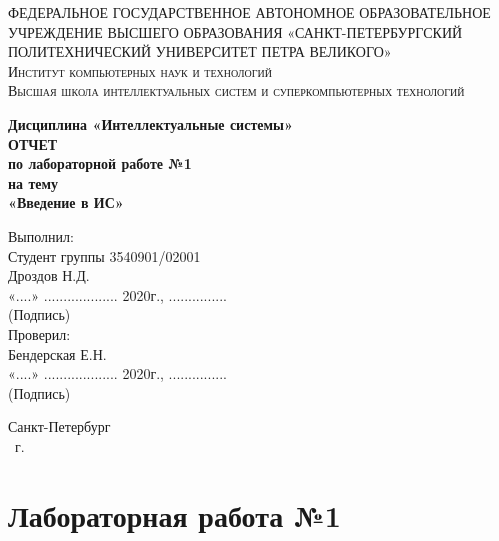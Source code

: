 \documentclass[14pt,a4paper,report]{report}
\begin{document}
\def\contentsname{Содержание}

\begin{titlepage}
	\begin{center}
		\textsc{ФЕДЕРАЛЬНОЕ ГОСУДАРСТВЕННОЕ АВТОНОМНОЕ ОБРАЗОВАТЕЛЬНОЕ УЧРЕЖДЕНИЕ ВЫСШЕГО ОБРАЗОВАНИЯ
«САНКТ-ПЕТЕРБУРГСКИЙ ПОЛИТЕХНИЧЕСКИЙ УНИВЕРСИТЕТ ПЕТРА ВЕЛИКОГО»\\[5mm]
			Институт компьютерных наук и технологий\\
			Высшая школа интеллектуальных систем и суперкомпьютерных технологий}
		
		\vfill
		
		\textbf{Дисциплина «Интеллектуальные системы»\\[10mm]
		ОТЧЕТ\\[2mm]
		по лабораторной работе №1\\[2mm]
		на тему\\[2mm]
			«Введение в ИС»\\[41mm]
		}
	\end{center}
	
	\hfill
	\begin{minipage}{.4\textwidth}
		Выполнил:\\[2mm] 
        Студент группы 3540901/02001\\
		Дроздов Н.Д.\\[2mm]
        «....» ................... 2020г., ...............\\
        \hspace*{38mm} (Подпись)\\[2mm]
		Проверил:\\[2mm] 
		Бендерская Е.Н.\\[2mm]
		«....» ................... 2020г., ...............\\
        \hspace*{38mm} (Подпись)\\
	\end{minipage}
	\vfill
	\begin{center}
		Санкт-Петербург\\ \the\year\ г.
	\end{center}
\end{titlepage}

\tableofcontents
\clearpage

\chapter{Лабораторная работа №1}
\end{document}

